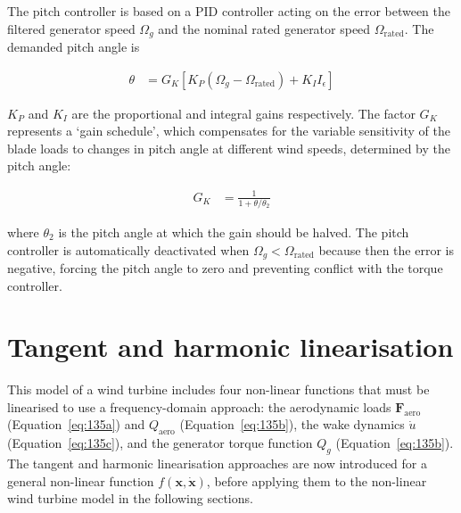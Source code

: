 \documentclass[a4paper,preprint]{elsarticle}
\newcommand{\mathup}{\mathrm}
\begin{document}
The pitch controller is based on a PID controller acting on the error between
the filtered generator speed $\Omega_g$ and the nominal rated generator speed
$\Omega_{\mathup{rated}}$. The demanded pitch angle is
\begin{linenomath}\begin{align}
  \label{eq:193}
    \theta{} &= G_K \left[ K_P \left( \Omega_g - \Omega_{\mathup{rated}} \right) + K_I I_\epsilon \right]
\end{align}\end{linenomath}
$K_P$ and $K_I$ are the proportional and integral gains respectively. The
factor $G_K$ represents a `gain schedule', which compensates for the variable
sensitivity of the blade loads to changes in pitch angle at different wind
speeds, determined by the pitch angle:
\begin{linenomath}\begin{align}
  \label{eq:194}
  G_K &= \frac{1}{1 + \theta{} / \theta{}_2}
\end{align}\end{linenomath}
where $\theta{}_2$ is the pitch angle at which the gain should be halved. The pitch
controller is automatically deactivated when $\Omega_g < \Omega_{\mathup{rated}}$ because
then the error is negative, forcing the pitch angle to zero and preventing
conflict with the torque controller.

\section{Tangent and harmonic linearisation}
\label{sec:linearisation}

This model of a wind turbine includes four non-linear functions that must be
linearised to use a frequency-domain approach: the aerodynamic loads
$\boldsymbol{F}_{\textrm{aero}}$ (Equation~\ref{eq:135a}) and $Q_{\textrm{aero}}$
(Equation~\ref{eq:135b}), the wake dynamics $\dot{u}$ (Equation~\ref{eq:135c}),
and the generator torque function $Q_g$ (Equation~\ref{eq:135b}). The tangent
and harmonic linearisation approaches are now introduced for a general
non-linear function $f(\mathbf{x}, \dot{\mathbf{x}})$, before applying them to
the non-linear wind turbine model in the following sections.
\end{document}
